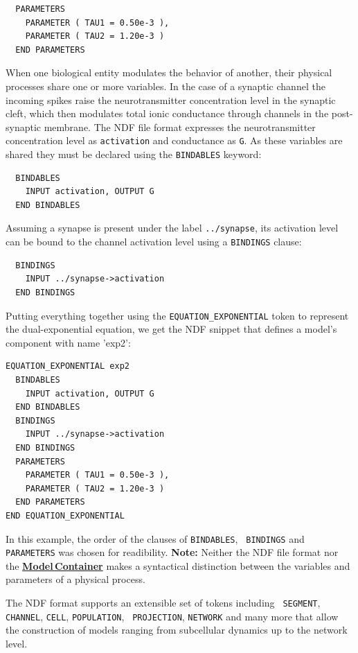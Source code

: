 \documentclass[12pt]{article}
\begin{document}
\begin{verbatim}
  PARAMETERS
    PARAMETER ( TAU1 = 0.50e-3 ),
    PARAMETER ( TAU2 = 1.20e-3 )
  END PARAMETERS
\end{verbatim}

When one biological entity modulates the behavior of another,
their physical processes share one or more variables.  In the case of
a synaptic channel the incoming spikes raise the neurotransmitter
concentration level in the synaptic cleft, which then modulates total
ionic conductance through channels in the post-synaptic membrane.  The NDF file format expresses the
neurotransmitter concentration level as {\tt activation} and
conductance as {\tt G}.  As these variables  are shared they must be declared using
the {\tt BINDABLES} keyword:
\begin{verbatim}
  BINDABLES
    INPUT activation, OUTPUT G
  END BINDABLES
\end{verbatim}
Assuming a synapse is present under the label {\tt ../synapse}, its
activation level can be bound to the channel activation level using a
{\tt BINDINGS} clause:
\begin{verbatim}
  BINDINGS
    INPUT ../synapse->activation
  END BINDINGS
\end{verbatim}

Putting everything together using the {\tt EQUATION\_EXPONENTIAL}
token to represent the dual-exponential equation, we get the NDF
snippet that defines a model's component with name 'exp2':
\begin{verbatim}
EQUATION_EXPONENTIAL exp2
  BINDABLES
    INPUT activation, OUTPUT G
  END BINDABLES
  BINDINGS
    INPUT ../synapse->activation
  END BINDINGS
  PARAMETERS
    PARAMETER ( TAU1 = 0.50e-3 ),
    PARAMETER ( TAU2 = 1.20e-3 )
  END PARAMETERS
END EQUATION_EXPONENTIAL
\end{verbatim}

In this example, the order of the clauses of {\tt BINDABLES}, {\tt
  BINDINGS} and {\tt PARAMETERS} was chosen for readibility.  
{\bf Note:} Neither the NDF file format nor
the \href{../model-container/model-container.tex}{\bf Model\,Container}
makes a syntactical distinction between the variables and parameters of a
physical process.

The NDF format supports an extensible set of tokens including {\tt
  SEGMENT}, {\tt CHANNEL}, {\tt CELL}, {\tt POPULATION}, {\tt
  PROJECTION}, {\tt NETWORK} and many more that allow the construction of
models ranging from subcellular dynamics up to the network level.
\end{document}
